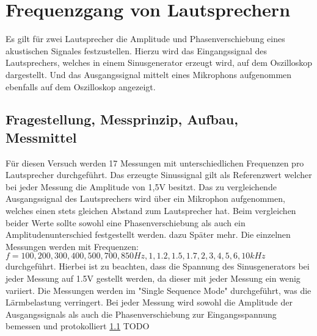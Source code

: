 %
%
\chapter{Frequenzgang von Lautsprechern}
Es gilt für zwei Lautsprecher die Amplitude und Phasenverschiebung eines akustischen Signales festzustellen.
Hierzu wird das Eingangssignal des Lautsprechers, welches in einem Sinusgenerator erzeugt wird, auf dem Oszilloskop dargestellt. Und das Ausgangssignal mittelt eines Mikrophons aufgenommen ebenfalls auf dem Oszilloskop angezeigt.

\label{chap:Aufnahme_eines_Dunkelbildes}

\section{Fragestellung, Messprinzip, Aufbau, Messmittel}
Für diesen Versuch werden 17 Messungen mit unterschiedlichen Frequenzen pro Lautsprecher durchgeführt.
Das erzeugte Sinussignal gilt als Referenzwert welcher bei jeder Messung die Amplitude von 1,5V besitzt.
Das zu vergleichende Ausgangssignal des Lautsprechers wird über ein Mikrophon aufgenommen, welches einen stets gleichen Abstand zum Lautsprecher hat.
Beim vergleichen beider Werte sollte sowohl eine Phasenverschiebung als auch ein Amplitudenunterschied festgestellt werden. dazu Später mehr.
Die einzelnen Messungen werden mit Frequenzen: $f = 100,200,300,400,500,700,850 Hz, 1, 1.2, 1.5, 1.7, 2, 3, 4, 5, 6, 10kHz$ durchgeführt. Hierbei ist zu beachten, dass die Spannung des Sinusgenerators bei jeder Messung auf 1.5V gestellt werden, da dieser mit jeder Messung ein wenig variiert.
Die Messungen werden im "Single Sequence Mode" durchgeführt, was die Lärmbelastung verringert.
Bei jeder Messung wird sowohl die Amplitude der Ausgangssignals als auch die Phasenverschiebung zur Eingangsspannung bemessen und protokolliert \ref{} TODO
\label{chap:VERSUCH_2_FRAGESTELLUNG}

